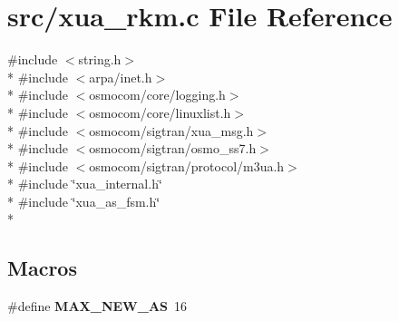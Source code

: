 \section{src/xua\+\_\+rkm.c File Reference}
\label{xua__rkm_8c}
{\ttfamily \#include $<$string.\+h$>$}\\*
{\ttfamily \#include $<$arpa/inet.\+h$>$}\\*
{\ttfamily \#include $<$osmocom/core/logging.\+h$>$}\\*
{\ttfamily \#include $<$osmocom/core/linuxlist.\+h$>$}\\*
{\ttfamily \#include $<$osmocom/sigtran/xua\+\_\+msg.\+h$>$}\\*
{\ttfamily \#include $<$osmocom/sigtran/osmo\+\_\+ss7.\+h$>$}\\*
{\ttfamily \#include $<$osmocom/sigtran/protocol/m3ua.\+h$>$}\\*
{\ttfamily \#include \char`\"{}xua\+\_\+internal.\+h\char`\"{}}\\*
{\ttfamily \#include \char`\"{}xua\+\_\+as\+\_\+fsm.\+h\char`\"{}}\\*
\subsection*{Macros}
\begin{DoxyCompactItemize}
\item 
\#define {\bf M\+A\+X\+\_\+\+N\+E\+W\+\_\+\+AS}~16
\end{DoxyCompactItemize}
